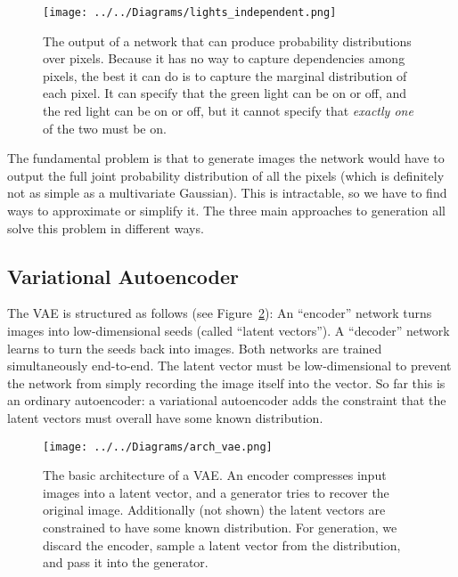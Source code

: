 \documentclass[11pt, a4paper, openany]{book}
\newcommand{\nquote}[1]{``{#1}''}
\begin{document}
\begin{figure}
  \centering
  \texttt{[image: ../../Diagrams/lights\_independent.png]}
  \caption[Output of a network that can produce probability distributions]{The output of a network that can produce probability distributions over pixels. Because it has no way to capture dependencies among pixels, the best it can do is to capture the marginal distribution of each pixel. It can specify that the green light can be on or off, and the red light can be on or off, but it cannot specify that \emph{exactly one} of the two must be on.}
  \label{independent}
\end{figure}

The fundamental problem is that to generate images the network would have to output the full joint probability distribution of all the pixels (which is definitely not as simple as a multivariate Gaussian). This is intractable, so we have to find ways to approximate or simplify it. The three main approaches to generation all solve this problem in different ways.

\subsection{Variational Autoencoder}

The VAE \citep{vae} is structured as follows (see Figure~\ref{archvae}): An \nquote{encoder} network turns images into low-dimensional seeds (called \nquote{latent vectors}). A \nquote{decoder} network learns to turn the seeds back into images. Both networks are trained simultaneously end-to-end. The latent vector must be low-dimensional to prevent the network from simply recording the image itself into the vector. So far this is an ordinary autoencoder: a variational autoencoder adds the constraint that the latent vectors must overall have some known distribution.

\begin{figure}
  \centering
  \texttt{[image: ../../Diagrams/arch\_vae.png]}
  \caption[Architecture of a VAE]{The basic architecture of a VAE. An encoder compresses input images into a latent vector, and a generator tries to recover the original image. Additionally (not shown) the latent vectors are constrained to have some known distribution. For generation, we discard the encoder, sample a latent vector from the distribution, and pass it into the generator.}
  \label{archvae}
\end{figure}
\end{document}
